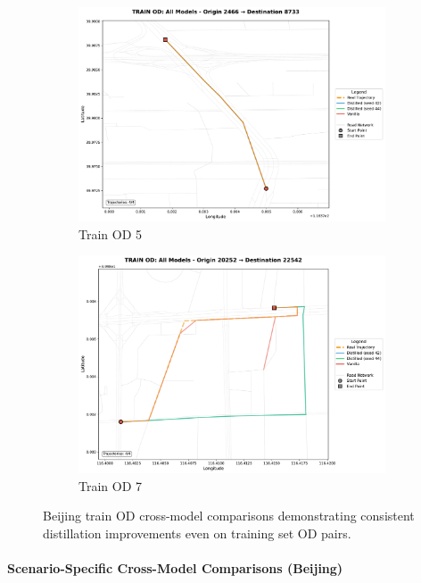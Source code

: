 \begin{figure}[H]
\begin{subfigure}{0.49\linewidth}
        \includegraphics[width=\linewidth]{assets/plots/eval/beijing/cross_model/train_od_comparison_5_origin2466_dest8733.pdf}
        \caption{Train OD 5}
    \end{subfigure}
    \begin{subfigure}{0.49\linewidth}
        \centering
        \includegraphics[width=\linewidth]{assets/plots/eval/beijing/cross_model/train_od_comparison_7_origin20252_dest22542.pdf}
        \caption{Train OD 7}
    \end{subfigure}
    \caption{Beijing train OD cross-model comparisons demonstrating consistent distillation improvements even on training set OD pairs.}
    \label{fig:appendix-beijing-cross-train}
\end{figure}

\paragraph{Scenario-Specific Cross-Model Comparisons (Beijing)}

